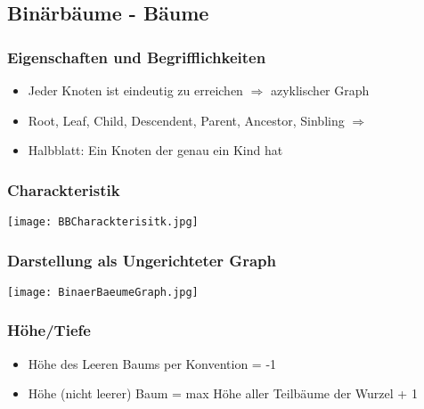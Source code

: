 			\vspace{1.5cm}

	
	\subsection{Binärbäume - Bäume}
		\begin{minipage}[t]{0.5\textwidth}
			\subsubsection{Eigenschaften und Begrifflichkeiten}
				\begin{itemize}
					\item Jeder Knoten ist eindeutig zu erreichen $\Rightarrow$ azyklischer Graph
					\item Root, Leaf, Child, Descendent, Parent, Ancestor, Sinbling $\Rightarrow$
					\item Halbblatt: Ein Knoten der genau ein Kind hat
				\end{itemize}

		
			\hspace{3cm}	
			\subsubsection{Charackteristik}
				\begin{center}
					\texttt{[image: BBCharackterisitk.jpg]}
				\end{center}
		\end{minipage}
		\hspace{0.5cm}
		\begin{minipage}[t]{0.45\textwidth}
			\begin{center}
			\subsubsection{Darstellung als Ungerichteter Graph}
				\texttt{[image: BinaerBaeumeGraph.jpg]}
			\end{center}

			\subsubsection{Höhe/Tiefe}
				\begin{itemize}
					\item Höhe des Leeren Baums per Konvention = -1
					\item Höhe (nicht leerer) Baum = max {Höhe aller Teilbäume der Wurzel} + 1
				\end{itemize}
		\end{minipage} \\

